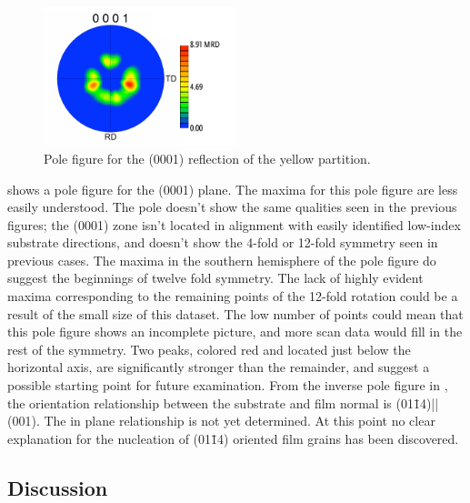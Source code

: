 \begin{figure}
\begin{center}
\includegraphics[width=0.5\textwidth]{yellow0001pole.pdf}
\caption[(0001) pole figure for yellow grains]{%
	Pole figure for the (0001) reflection of the yellow partition.}
\label{fig:yellow0001pole}
\end{center}
\end{figure}
 shows a pole figure for the (0001) plane. The maxima for this
pole figure are less easily understood.  The pole doesn't show the same qualities seen in
the previous figures; the (0001) zone isn't located in alignment with easily identified
low-index substrate directions, and doesn't show the 4-fold or 12-fold symmetry seen in
previous cases. The maxima in the southern hemisphere of the pole figure do suggest the
beginnings of twelve fold symmetry. The lack of highly evident maxima corresponding to the
remaining points of the 12-fold rotation could be a result of the small size of this
dataset. The low number of points could mean that this pole figure shows an incomplete
picture, and more scan data would fill in the rest of the symmetry. Two peaks, colored red 
and located just below the horizontal axis, are significantly stronger than the remainder, 
and suggest a possible starting point for future examination. From the inverse pole figure 
in , the orientation relationship 
between the substrate and film normal is (01\={1}4)||(001). The in
plane relationship is not yet determined. At this point no clear explanation for the 
nucleation of (01\={1}4) oriented film grains has been discovered.


\subsection{Discussion}
\label{subsec:single.growth.discussion}

